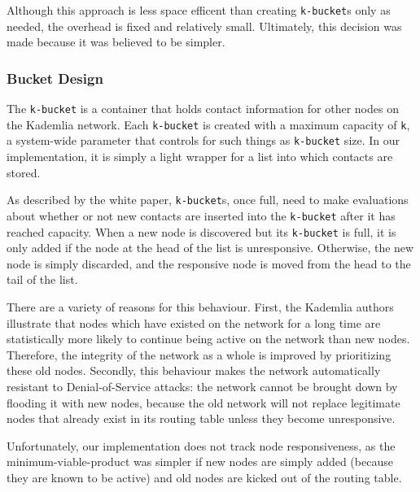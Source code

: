 \documentclass[12pt]{report}
\newcommand{\code}[1]{\colorbox{codegray}{\texttt{#1}}}
\begin{document}
                Although this approach is less space efficent than creating
                \code{k-bucket}s only as needed, the overhead is fixed and
                relatively small.  Ultimately, this decision was made because
                it was believed to be simpler.

            \subsubsection{Bucket Design\label{bucket_design}}
                The \code{k-bucket} is a container
                that holds contact information for other nodes on the Kademlia
                network.  Each \code{k-bucket} is created with a maximum
                capacity of \code{k}, a system-wide parameter that controls for
                such things as \code{k-bucket} size.  In our implementation, it
                is simply a light wrapper for a list into which contacts are
                stored.
                
                As described by the white paper, \code{k-bucket}s, once full,
                need to make evaluations about whether or not new contacts are
                inserted into the \code{k-bucket} after it has reached capacity.
                When a new node is discovered but its \code{k-bucket} is full,
                it is only added if the node at the head of the list is
                unresponsive.  Otherwise, the new node is simply discarded, and
                the responsive node is moved from the head to the tail of the
                list.

                There are a variety of reasons for this behaviour.  First, the
                Kademlia authors illustrate that nodes which have existed on
                the network for a long time are statistically more likely to
                continue being active on the network than new nodes.
                Therefore, the integrity of the network as a whole is improved
                by prioritizing these old nodes.  Secondly, this behaviour
                makes the network automatically resistant to Denial-of-Service
                attacks: the network cannot be brought down by flooding it with
                new nodes, because the old network will not replace legitimate
                nodes that already exist in its routing table unless they
                become unresponsive.

                Unfortunately, our implementation does not track node
                responsiveness, as the minimum-viable-product was simpler if
                new nodes are simply added (because they are known to be
                active) and old nodes are kicked out of the routing table.
\end{document}
